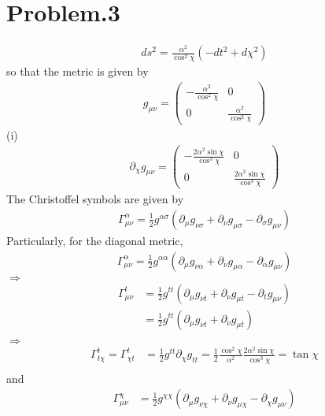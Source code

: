\documentclass[12pt]{article}
\begin{document}
\section*{Problem.3}
\begin{align}
ds^2 = \frac{\alpha^2}{\cos^2{\chi}} \left( - dt^2 + d \chi^2 \right)
\end{align}
so that the metric is given by
\begin{align}
g_{\mu \nu} =
\begin{pmatrix}
- \frac{\alpha^2}{\cos^2{\chi}} & 0 \\
0 & \frac{\alpha^2}{\cos^2{\chi}}
\end{pmatrix}
\end{align}
(i)
\begin{align}
\partial_{\chi} g_{\mu \nu} =
\begin{pmatrix}
- \frac{2 \alpha^2 \sin{\chi}}{\cos^3{\chi}} & 0 \\
0 & \frac{2 \alpha^2 \sin{\chi}}{\cos^3{\chi}}
\end{pmatrix}
\end{align}
The Christoffel symbols are given by
\begin{align}
\Gamma^{\alpha}_{\mu \nu} = \frac{1}{2} g^{\alpha \sigma} \left(\partial_{\mu} g_{\nu \sigma} + \partial_{\nu} g_{\mu \sigma} - \partial_{\sigma} g_{\mu \nu} \right)
\end{align}
Particularly, for the diagonal metric,
\begin{align}
\Gamma^{\alpha}_{\mu \nu} = \frac{1}{2} g^{\alpha \alpha} \left(\partial_{\mu} g_{\nu \alpha} + \partial_{\nu} g_{\mu \alpha} - \partial_{\alpha} g_{\mu \nu} \right)
\end{align}
$\Rightarrow$
\begin{align}
\Gamma^{t}_{\mu \nu} &= \frac{1}{2} g^{tt} \left(\partial_{\mu} g_{\nu t} + \partial_{\nu} g_{\mu t} - \partial_{t} g_{\mu \nu} \right) \\
&= \frac{1}{2} g^{tt} \left(\partial_{\mu} g_{\nu t} + \partial_{\nu} g_{\mu t} \right) \\
\end{align}
$\Rightarrow$
\begin{align}
\Gamma^{t}_{t \chi} = \Gamma^{t}_{\chi t} &= \frac{1}{2} g^{tt} \partial_{\chi} g_{t t} = \frac{1}{2} \frac{\cos^2{\chi}}{\alpha^2} \frac{2 \alpha^2 \sin{\chi}}{\cos^3{\chi}} = \tan{\chi}\\
\end{align}
and
\begin{align}
\Gamma^{\chi}_{\mu \nu} &= \frac{1}{2} g^{\chi \chi} \left(\partial_{\mu} g_{\nu \chi} + \partial_{\nu} g_{\mu \chi} - \partial_{\chi} g_{\mu \nu} \right)
\end{align}
\end{document}
